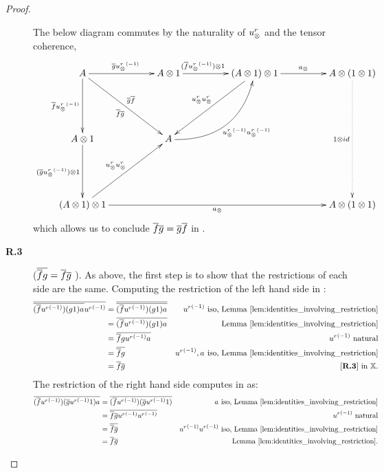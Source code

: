 \begin{proof}
\begin{description}

      The below diagram commutes by the naturality of $u_{\otimes}^r$ and the tensor coherence,
      \[
        \xymatrix @C=48pt @R=55pt{
          A \ar[r]^{\restr{g} \inv{\usr}}
            \ar[dr]_{\restr{f}\restr{g}}^{\restr{g}\restr{f}}
            \ar[d]_{\restr{f}\inv{\usr}}
            &A\*1 \ar[r]^(.4){(\rst{f}\inv{\usr})\*1}
            & (A \*1) \* 1
            \ar[r]^{a_{\*}}  \ar[dl]_{\usr \usr}
            & A \* (1\*1) \ar@{.>}[dd]_{1\*id}\\ %
          A\*1 \ar[d]_{(\rst{g}\inv{\usr})\*1}
            &A \ar@/_25pt/[ur]_{\inv{\usr}\inv{\usr}} \\
          (A\*1)\*1 \ar[rrr]_{a_\*} \ar[ur]^{\usr \usr}
            &&& A \* (1\*1)
        }
      \]
      which allows us to conclude $\overline{f} \overline{g} = \overline{g} \overline{f}$ in \Xt.



    \item[\textbf{R.3}] ($\overline{\overline{f} g} = \overline{f} \overline{g}$ ). As above, the first step is
      to show that the restrictions of each side are the same. Computing the restriction of the left
      hand side in \X:
      \begin{align*}
        \rst{\restr{(\restr{f} \inv{\usr}) (g\* 1) a_{\*}} \inv{\usr}}
        & = \rst{\restr{(\restr{f} \inv{\usr}) (g\* 1) a_{\*}}} & \inv{\usr}
          \text{ iso, Lemma \ref{lem:identities_involving_restriction}}\\
        & = \restr{(\restr{f} \inv{\usr}) (g\* 1) a_{\*}} &
          \text{Lemma \ref{lem:identities_involving_restriction}}\\
        & = \restr{\restr{f} g \inv{\usr} a_{\*}} & \inv{\usr} \text{ natural}\\
        & = \restr{\restr{f} g } & \inv{\usr}, a_{\*}
          \text{ iso, Lemma \ref{lem:identities_involving_restriction}}\\
        & = \restr{f} \rst{g} & \text{\rthree in }\X.
      \end{align*}
      The restriction of the right hand side computes in \X as:
      \begin{align*}
        \rst{(\restr{f} \inv{\usr}) (\rst{g} \inv{\usr}\* 1) a_{\*}}
        & = \rst{(\restr{f} \inv{\usr}) (\rst{g} \inv{\usr}\* 1) } &  a_{\*}
          \text{ iso, Lemma \ref{lem:identities_involving_restriction}}\\
        & = \rst{\restr{f}  \rst{g} \inv{\usr}\inv{\usr} } &  \inv{\usr} \text{ natural}\\
        & = \rst{\restr{f}  \rst{g} } &\inv{\usr}\inv{\usr}
          \text{ iso, Lemma \ref{lem:identities_involving_restriction}}\\
        & = \restr{f} \rst{g} & \text{Lemma \ref{lem:identities_involving_restriction}}.
      \end{align*}


\end{description}
\end{proof}

